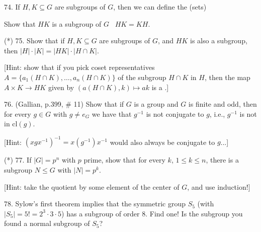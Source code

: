 \documentclass[12pt]{article}
\begin{document}
\begin{description}

\item{74.} If $H,K\subseteq G$ are subgroups of $G$, then we can define the  (sets)

\ssk


\ssk

\item{\spc} Show that $HK$ is a subgroup of $G$ \lra\ $HK=KH$.

\msk

\item{(*) 75.} Show that if $H,K\subseteq G$ are subgroups of $G$, and $HK$ is also 
a subgroup, then $|H|\cdot|K|=|HK|\cdot|H\cap K|$. 

\msk

[Hint: show that if you pick coset representatives $A=\{a_1(H\cap K),\ldots,a_n(H\cap K)\}$ of the subgroup
$H\cap K$ in $H$, then the map $A\times K\rightarrow HK$ given by $(a(H\cap K),k)\mapsto ak$ is 
a .]

\msk

\item{76.} (Gallian, p.399, \# 11) Show that if $G$ is a group and $G$ is finite and odd, then 
for every $g\in G$ with $g\neq e_G$ we have that $g^{-1}$ is not conjugate to $g$, i.e., 
$g^{-1}$ is not in $\textrm{cl}(g)$.

\ssk

\item{\spc} [Hint: $(xgx^{-1})^{-1}=x(g^{-1})x^{-1}$ would also always be conjugate to $g$...]

\msk

\item{(*) 77.} If $|G|=p^n$ with $p$ prime, show that for every $k$, $1\leq k\leq n$,
there is a  subgroup $N\leq G$ with $|N|=p^k$.

\ssk

\item{\spc} [Hint: take the quotient by some element of the center of $G$, and use induction!]

\msk

\item{78.} Sylow's first theorem implies that the symmetric group $S_5$ (with $|S_5|=5!=2^3\cdot 3\cdot 5$)
has a subgroup of order $8$. Find one! Is the subgroup you found a normal subgroup of $S_5$?


\end{description}
\end{document}
